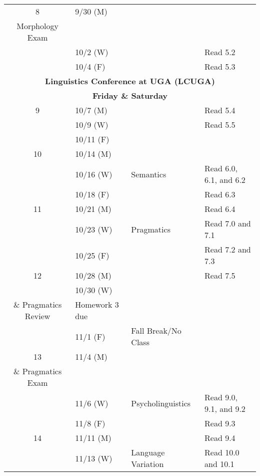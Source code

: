 \documentclass{article}
\makeatletter
\newcommand{\cellbreak}[2]{
    \begin{tabular}[t]{@{}l@{}}
      #1\\
      #2
    \end{tabular}}
\newcommand{\rowvspace}{\rule{0pt}{14pt}}
\makeatother
\begin{document}
\begin{longtable}{c l l l}
      8     & 9/30 (M)    & \cellbreak{Phonology \&}
                                      {Morphology Exam}     & \\
            & 10/2 (W)    &                                 & Read 5.2\\
            & 10/4 (F)    &                                 & Read 5.3\\
      \multicolumn{4}{c}{\textbf{Linguistics Conference at UGA (LCUGA)}\rowvspace}\\
      \multicolumn{4}{c}{\textbf{Friday \& Saturday}}\\
      9     & 10/7 (M)    & \rowvspace                      & Read 5.4\\
            & 10/9 (W)    &                                 & Read 5.5\\
            & 10/11 (F)   &                                 & \\
      10    & 10/14 (M)   &                                 & \\
            & 10/16 (W)   & Semantics                       & Read 6.0, 6.1, and 6.2\\
            & 10/18 (F)   &                                 & Read 6.3\\
      11    & 10/21 (M)   &                                 & Read 6.4\\
            & 10/23 (W)   & Pragmatics                      & Read 7.0 and 7.1\\
            & 10/25 (F)   &                                 & Read 7.2 and 7.3\\
      12    & 10/28 (M)   &                                 & Read 7.5\\
            & 10/30 (W)   & \cellbreak{Syntax, Semantics}
                                      {\& Pragmatics Review}& Homework 3 due\\
            & 11/1 (F)    & Fall Break/No Class             & \\
      13    & 11/4 (M)    & \cellbreak{Syntax, Semantics}
                                      {\& Pragmatics Exam}  & \\
            & 11/6 (W)    & Psycholinguistics               & Read 9.0, 9.1, and 9.2\\
            & 11/8 (F)    &                                 & Read 9.3\\
      14    & 11/11 (M)   &                                 & Read 9.4\\
            & 11/13 (W)   & Language Variation              & Read 10.0 and 10.1\\

\end{longtable}
\end{document}

